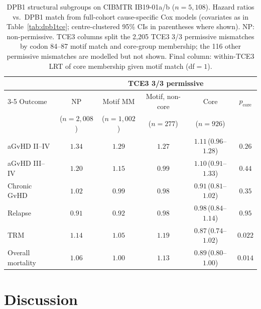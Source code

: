 \documentclass[11pt,a4paper]{article}
\begin{document}
\begin{table}[ht]
\centering
\caption{DPB1 structural subgroups on CIBMTR IB19-01a/b ($n=5{,}108$).
  Hazard ratios vs.\ DPB1 match from full-cohort cause-specific Cox models
  (covariates as in Table~\ref{tab:dpb1tce}; centre-clustered 95\% CIs in
  parentheses where shown).  NP: non-permissive.  TCE3 columns split the
  2{,}205 TCE3 3/3 permissive mismatches by codon 84--87 motif match and
  core-group membership; the 116 other permissive mismatches are modelled
  but not shown.  Final column: within-TCE3 LRT of core membership given
  motif match (df${}=1$).}
\label{tab:dpb1struct}
\small
\begin{tabular}{lccccc}
\toprule
 & & \multicolumn{3}{c}{TCE3 3/3 permissive} & \\
\cmidrule(lr){3-5}
Outcome & NP & Motif MM & Motif, non-core & Core & $p_{\text{core}}$ \\
 & ($n=2{,}008$) & ($n=1{,}002$) & ($n=277$) & ($n=926$) & \\
\midrule
aGvHD II--IV      & $1.34$ & $1.29$ & $1.27$ & $1.11$\,($0.96$--$1.28$) & $0.26$ \\
aGvHD III--IV     & $1.20$ & $1.15$ & $0.99$ & $1.10$\,($0.91$--$1.33$) & $0.44$ \\
Chronic GvHD      & $1.02$ & $0.99$ & $0.98$ & $0.91$\,($0.81$--$1.02$) & $0.35$ \\
Relapse           & $0.91$ & $0.92$ & $0.98$ & $0.98$\,($0.84$--$1.14$) & $0.95$ \\
TRM               & $1.14$ & $1.05$ & $1.19$ & $0.87$\,($0.74$--$1.02$) & $0.022$ \\
Overall mortality & $1.06$ & $1.00$ & $1.13$ & $0.89$\,($0.80$--$1.00$) & $0.014$ \\
\bottomrule
\end{tabular}
\end{table}

\section{Discussion}
\end{document}
